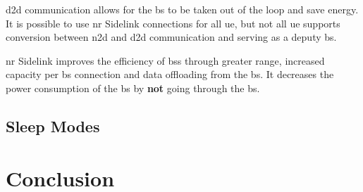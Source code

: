 \documentclass[11pt,a4paper]{article}
\begin{document}
\acrlong{d2d} communication allows for the \acrshort{bs} to be taken out of the loop and save energy.
It is possible to use \acrshort{nr} Sidelink connections for all \acrlong{ue}, but not all \acrshort{ue} supports conversion between \acrshort{n2d} and \acrshort{d2d} communication and serving as a deputy \acrshort{bs}.

\acrshort{nr} Sidelink improves the efficiency of \acrlong{bs}s through greater range, increased capacity per \acrshort{bs} connection and data offloading from the \acrshort{bs}.
It decreases the power consumption of the \acrshort{bs} by \textbf{not} going through the \acrshort{bs}.

\subsection{Sleep Modes}\label{subsec:sleep}

\section{Conclusion}\label{sec:conclusion}


\clearpage

\appendix
\glsaddall
\printnoidxglossary[type=\acronymtype,nonumberlist]

\renewcommand*{\refname}{\section{References}}
{}
\end{document}
